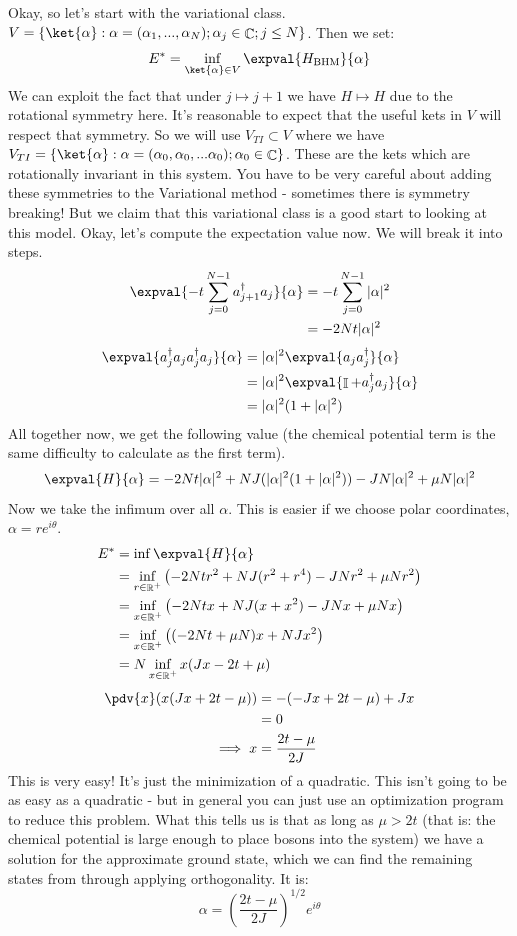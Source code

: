 \documentclass{article}
\DeclareMathOperator{\RR}{\mathbb{R}}
\DeclareMathOperator{\II}{\mathbb{I}}
\DeclareMathOperator{\CC}{\mathbb{C}}
\begin{document}
Okay, so let's start with the variational class. $V =\{\ket{\alpha}:\alpha=(\alpha_1,...,\alpha_N);\alpha_j \in \CC;j\leq N\}$. Then we set:
\[E^* = \inf_{\ket{\alpha} \in V}\expval{H_{\textrm{BHM}}}{\alpha}\]
We can exploit the fact that under $j\mapsto j+1$ we have $H \mapsto H$ due to the rotational symmetry here. It's reasonable to expect that the useful kets in $V$ will respect that symmetry. So we will use $V_{TI}\subset V$ where we have $V_{TI} = \{\ket{\alpha}:\alpha=(\alpha_0,\alpha_0,...\alpha_0);\alpha_0\in\CC\}$. These are the kets which are rotationally invariant in this system. You have to be very careful about adding these symmetries to the Variational method - sometimes there is symmetry breaking! But we claim that this variational class is a good start to looking at this model. Okay, let's compute the expectation value now. We will break it into steps.
\begin{align}
\expval{-t\sum_{j=0}^{N-1}a_{j+1}^\dagger a_j}{\alpha} &= -t\sum_{j=0}^{N-1}|\alpha|^2\\
&= -2Nt|\alpha|^2
\end{align}
\begin{align}
\expval{a_j^\dagger a_j a_j^\dagger a_j}{\alpha} &= |\alpha|^2 \expval{a_j a^\dagger_j}{\alpha}\\
&= |\alpha|^2 \expval{\II + a_j^\dagger a_j}{\alpha} \\
&= |\alpha|^2 (1+|\alpha|^2)
\end{align}
All together now, we get the following value (the chemical potential term is the same difficulty to calculate as the first term).
\begin{equation}
\expval{H}{\alpha} = -2Nt|\alpha|^2 + NJ(|\alpha|^2(1+|\alpha|^2)) - JN|\alpha|^2 + \mu N |\alpha|^2
\end{equation}
Now we take the infimum over all $\alpha$. This is easier if we choose polar coordinates, $\alpha = re^{i\theta}$.
\begin{align}
E^* &= \inf \expval{H}{\alpha}\\
&= \inf_{r\in \RR^+} \left(-2Ntr^2 +NJ(r^2+r^4) - JNr^2 +\mu Nr^2 \right)\\
&= \inf_{x\in \RR^+} \left(-2Ntx +NJ(x+x^2) - JNx +\mu Nx \right)\\
&= \inf_{x\in \RR^+} \left((-2Nt+\mu N)x + NJx^2\right)\\
&= N \inf_{x\in \RR^+} x(Jx - 2t+\mu)
\end{align}
\begin{align}
\pdv{x}( x(Jx+2t-\mu))&=-(-Jx+2t-\mu)+Jx\\
&=0\\
\implies x &= \frac{2t-\mu}{2J}
\end{align}
This is very easy! It's just the minimization of a quadratic. This isn't going to be as easy as a quadratic - but in general you can just use an optimization program to reduce this problem. What this tells us is that as long as $\mu>2t$ (that is: the chemical potential is large enough to place bosons into the system) we have a solution for the approximate ground state, which we can find the remaining states from through applying orthogonality. It is:
\[\alpha = \left(\frac{2t-\mu}{2J}\right)^{1/2}e^{i\theta}\]
\end{document}
